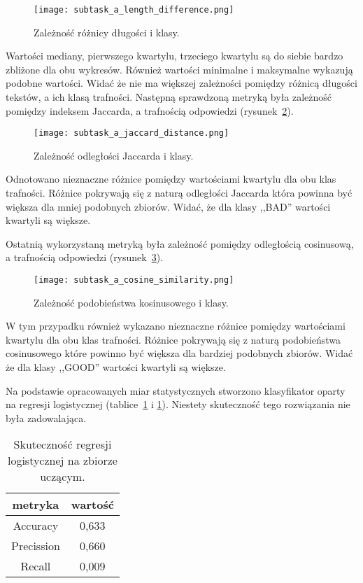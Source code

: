 \begin{figure}[H]
\caption{Zależność różnicy długości i klasy. \label{fig:mstatystyczna}}
\centering
\texttt{[image: subtask\_a\_length\_difference.png]}
\end{figure}

Wartości mediany, pierwszego kwartylu, trzeciego kwartylu są do siebie bardzo zbliżone dla obu wykresów. Również wartości minimalne i maksymalne wykazują podobne wartości. Widać że nie ma większej zależności pomiędzy różnicą długości tekstów, a ich klasą trafności. 
Następną sprawdzoną metryką była zależność pomiędzy indeksem Jaccarda, a trafnością odpowiedzi (rysunek~\ref{fig:jaccarda}). 



\begin{figure}[H]
\caption{Zależność odległości Jaccarda i klasy. \label{fig:jaccarda}}
\centering
\texttt{[image: subtask\_a\_jaccard\_distance.png]}
\end{figure}

Odnotowano nieznaczne różnice pomiędzy wartościami kwartylu dla obu klas trafności. Różnice pokrywają się z naturą odległości Jaccarda która powinna być większa dla mniej podobnych zbiorów. Widać, że dla klasy ,,BAD'' wartości kwartyli są większe.
  
Ostatnią wykorzystaną metryką była zależność pomiędzy odległością cosinusową, a trafnością odpowiedzi (rysunek~\ref{fig:trafsnosca}). 



\begin{figure}[H]
\caption{Zależność podobieństwa kosinusowego i klasy. \label{fig:trafsnosca}}
\centering
\texttt{[image: subtask\_a\_cosine\_similarity.png]}
\end{figure}

W tym przypadku również wykazano nieznaczne różnice pomiędzy wartościami kwartylu dla obu klas trafności. Różnice pokrywają się z naturą podobieństwa cosinusowego które powinno być większa dla bardziej podobnych zbiorów. Widać że dla klasy ,,GOOD'' wartości kwartyli są większe. 

Na podstawie opracowanych miar statystycznych stworzono klasyfikator oparty na regresji logistycznej (tablice~\ref{tab:train_set_statistics_score_table} i \ref{tab:train_set_statistics_score_table}). Niestety skuteczność tego rozwiązania nie była zadowalająca.

\begin{table}[H]
\caption{Skuteczność regresji logistycznej na zbiorze uczącym. \label{tab:train_set_statistics_score_table}}
    \begin{center}
        \begin{tabular}{ |c|c| } 
            \hline
            metryka & wartość\\
            \hline
            Accuracy & 0,633 \\
            \hline
            Precission & 0,660 \\
            \hline
            Recall & 0,009 \\ 
            \hline
        \end{tabular}
    \end{center}
\end{table}

